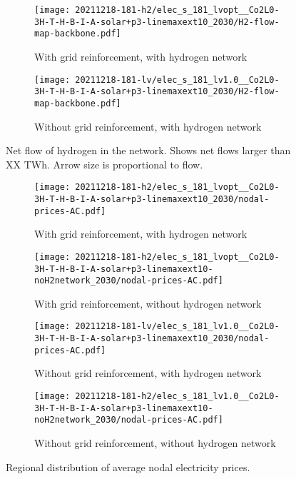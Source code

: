 \begin{figure}
    \begin{subfigure}{0.49\textwidth}
        \centering
        \caption{With grid reinforcement, with hydrogen network}
        \texttt{[image: 20211218-181-h2/elec\_s\_181\_lvopt\_\_Co2L0-3H-T-H-B-I-A-solar+p3-linemaxext10\_2030/H2-flow-map-backbone.pdf]}
    \end{subfigure}
    \begin{subfigure}{0.49\textwidth}
        \centering
        \caption{Without grid reinforcement, with hydrogen network}
        \texttt{[image: 20211218-181-lv/elec\_s\_181\_lv1.0\_\_Co2L0-3H-T-H-B-I-A-solar+p3-linemaxext10\_2030/H2-flow-map-backbone.pdf]}
    \end{subfigure}
    \caption{Net flow of hydrogen in the network. Shows net flows larger than XX TWh. Arrow size is proportional to flow.}
    \label{fig:si:flow-h2}
\end{figure}

\begin{figure}
    \begin{subfigure}{0.49\textwidth}
        \centering
        \caption{With grid reinforcement, with hydrogen network}
        \texttt{[image: 20211218-181-h2/elec\_s\_181\_lvopt\_\_Co2L0-3H-T-H-B-I-A-solar+p3-linemaxext10\_2030/nodal-prices-AC.pdf]}
    \end{subfigure}
    \begin{subfigure}{0.49\textwidth}
        \centering
        \caption{With grid reinforcement, without hydrogen network}
        \texttt{[image: 20211218-181-h2/elec\_s\_181\_lvopt\_\_Co2L0-3H-T-H-B-I-A-solar+p3-linemaxext10-noH2network\_2030/nodal-prices-AC.pdf]}
    \end{subfigure}
    \begin{subfigure}{0.49\textwidth}
        \centering
        \caption{Without grid reinforcement, with hydrogen network}
        \texttt{[image: 20211218-181-lv/elec\_s\_181\_lv1.0\_\_Co2L0-3H-T-H-B-I-A-solar+p3-linemaxext10\_2030/nodal-prices-AC.pdf]}
    \end{subfigure}
    \begin{subfigure}{0.49\textwidth}
        \centering
        \caption{Without grid reinforcement, without hydrogen network}
        \texttt{[image: 20211218-181-h2/elec\_s\_181\_lv1.0\_\_Co2L0-3H-T-H-B-I-A-solar+p3-linemaxext10-noH2network\_2030/nodal-prices-AC.pdf]}
    \end{subfigure}
    \caption{Regional distribution of average nodal electricity prices.}
    \label{fig:si:lmp-ac}
\end{figure}

